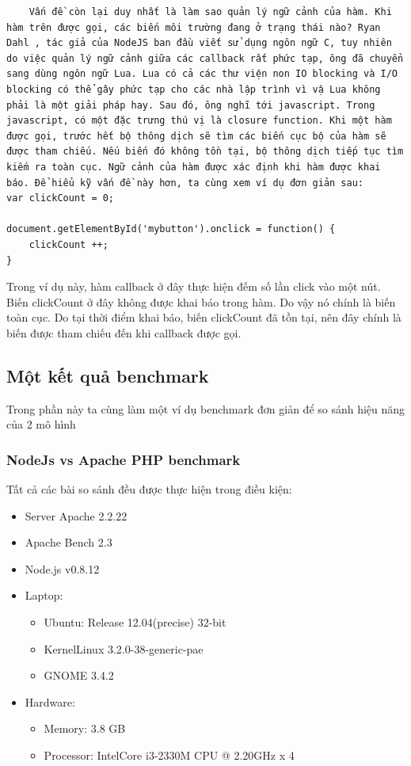 \begin{verbatim}
	Vấn đề còn lại duy nhất là làm sao quản lý ngữ cảnh của hàm. Khi hàm trên được gọi, các biến môi trường đang ở trạng thái nào? Ryan Dahl , tác giả của NodeJS ban đầu viết sử dụng ngôn ngữ C, tuy nhiên do việc quản lý ngữ cảnh giữa các callback rất phức tạp, ông đã chuyển sang dùng ngôn ngữ Lua. Lua có cả các thư viện non IO blocking và I/O blocking có thể gây phức tạp cho các nhà lập trình vì vậ Lua không phải là một giải pháp hay. Sau đó, ông nghĩ tới javascript. Trong javascript, có một đặc trưng thú vị là closure function. Khi một hàm được gọi, trước hết bộ thông dịch sẽ tìm các biến cục bộ của hàm sẽ được tham chiếu. Nếu biến đó không tồn tại, bộ thông dịch tiếp tục tìm kiếm ra toàn cục. Ngữ cảnh của hàm được xác định khi hàm được khai báo. Để hiểu kỹ vấn đề này hơn, ta cùng xem ví dụ đơn giản sau:
var clickCount = 0;
	
document.getElementById('mybutton').onclick = function() {
	clickCount ++;
}
\end{verbatim}
	Trong ví dụ này, hàm callback ở đây thực hiện đếm số lần click vào một nút. Biến clickCount ở đây không được khai báo trong hàm. Do vậy nó chính là biến toàn cục. Do tại thời điểm khai báo, biến clickCount đã tồn tại, nên đây chính là biến được tham chiếu đến khi callback được gọi.
	
\subsection{Một kết quả benchmark}
Trong phần này ta cùng làm một ví dụ benchmark đơn giản để so sánh hiệu năng của 2 mô hình \\
\subsubsection{NodeJs vs Apache PHP benchmark}

Tất cả các bài so sánh đều được thực hiện trong điều kiện:
\begin{framed}
	\begin{itemize}
		\item Server Apache 2.2.22
		\item Apache Bench 2.3
		\item Node.js v0.8.12
		\item Laptop: 
		
		\begin{itemize}
			\item Ubuntu: Release 12.04(precise) 32-bit
			\item KernelLinux 3.2.0-38-generic-pae
			\item GNOME 3.4.2
		\end{itemize}		

		\item Hardware:
		\begin{itemize}
			\item Memory: 3.8 GB
			\item Processor: IntelCore i3-2330M CPU @ 2.20GHz x 4
		\end{itemize}
	\end{itemize}
\end{framed}
	
